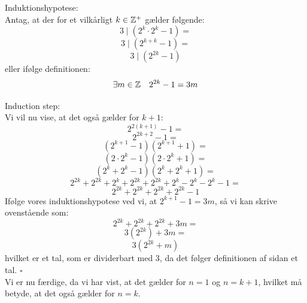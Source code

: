 \documentclass[a4paper,12pt]{article}
\begin{document}
Induktionshypotese:\\
Antag, at der for et vilkårligt $k \in \mathbb{Z}^+$ gælder følgende:\\
\[3 \mid (2^k \cdot 2^k - 1) = \]
\[3 \mid (2^{k+k} - 1) = \]
\[3 \mid (2^{2k} - 1)\]
eller ifølge definitionen:\\
\[\exists m\in \mathbb{Z} \quad 2^{2k} - 1 = 3m\]

Induction step:\\
Vi vil nu vise, at det også gælder for $k+1$:\\
\[2^{2(k+1)} - 1 = \]
\[2^{2k+2} - 1 = \]
\[(2^{k+1} - 1)(2^{k+1} + 1)=\]
\[(2 \cdot 2^{k} - 1)(2 \cdot 2^{k} + 1)=\]
\[( 2^{k} +  2^{k} - 1)( 2^{k} +  2^{k} + 1)=\]
\[2^{2k} + 2^{2k} + 2^k + 2^{2k} + 2^{2k} + 2^k - 2^k - 2^k - 1=\]
\[2^{2k} + 2^{2k} + 2^{2k} + 2^{2k} - 1\]
Ifølge vores induktionshypotese ved vi, at $2^{k+1} - 1 = 3m$, så vi kan skrive ovenstående som:
\[2^{2k} + 2^{2k} + 2^{2k} + 3m =\]
\[3(2^{2k}) + 3m = \]
\[3(2^{2k} + m)\]
hvilket er et tal, som er dividerbart med $3$, da det følger definitionen af sidan et tal. $\square\ $\\

Vi er nu færdige, da vi har vist, at det gælder for $n = 1$ og $n = k+1$, hvilket må betyde, at det også gælder for $n = k$.
\end{document}
